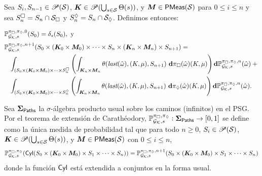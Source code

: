 Sea $S_i,S_{n-1}\in\mathscr{P}(\mathcal{S})$,
$\boldsymbol{K}\in\mathscr{P}(\bigcup_{s\in\mathcal{S}}\Theta(s))$, y
$\boldsymbol{M}\in\mathsf{PMeas}(\mathcal{S})$ para $0\leq i\leq n$ y sea $S_n^{\Box} =
	S_n\cap\mathcal{S}_{\Box}$ y $S_n^{\Diamond} = S_n\cap\mathcal{S}_{\Diamond}$. Definimos entonces:

\vspace{-1cm}
\begin{align*}
	\makebox[.8em]{}
	&\hspace{-.8em}\Prob^{\strat_{\maxplay},\strat_{\minplay},0}_{\StochGK,s}(S_0) =  \Dirac_{s}(S_0), \text{   y} \\[.5ex]
	&\hspace{-.8em}\Prob^{\strat_{\maxplay},\strat_{\minplay},n+1}_{\StochGK,s}(S_0\times(\polys_0\times \meass_0)\times \cdots\times S_n\times(\polys_n\times\meass_n)\times S_{n+1}) = {} \\
	&\int_{(S_0\times(\polys_0\times \meass_0)\times \cdots\times S_n^\maxplay}
	\left(
	\int_{\polys_n\times\meass_n}\sgtrans(\last(\hat{\omega}),(K,\mu), S_{n+1})\ \diff\strat_\maxplay(\hat{\omega})(K,\mu)
	\right)
	\diff\Prob^{\strat_{\maxplay},\strat_{\minplay},n}_{\StochGK,s}(\hat{\omega}) + {} \\
	&\int_{(S_0\times(\polys_0\times \meass_0)\times \cdots\times S_n^\minplay}
	\left(
	\int_{\polys_n\times\meass_n}\sgtrans(\last(\hat{\omega}),(K,\mu), S_{n+1})\ \diff\strat_\minplay(\hat{\omega})(K,\mu)
	\right)
	\diff\Prob^{\strat_{\maxplay},\strat_{\minplay},n}_{\StochGK,s}(\hat{\omega}).
\end{align*}

Sea $\bm{\Sigma}_{\textsf{Paths}}$ la $\sigma$-álgebra producto usual sobre los caminos
(infinitos) en el PSG. Por el teorema de extensión de Carathéodory,
$\mathbb{P}^{\pi_{{\Box}},\pi_{{\Diamond}}}_{{\mathcal{G}_{\mathcal{K}}},s}:\bm{\Sigma}_{\textsf{Paths}}\to[0,1]$
se define como la única medida de probabilidad tal que para todo $n\geq 0$,
$S_i\in\mathscr{P}(\mathcal{S})$,
$\boldsymbol{K}\in\mathscr{P}(\bigcup_{s\in\mathcal{S}}\Theta(s))$, y
$\boldsymbol{M}\in\mathsf{PMeas}(\mathcal{S})$ con $0\leq i\leq n$,%
%
\[\mathbb{P}^{\pi_{{\Box}},\pi_{{\Diamond}}}_{{\mathcal{G}_{\mathcal{K}}},s}(\textsf{Cyl}(S_0\times(\boldsymbol{K}_0\times \boldsymbol{M}_0)\times S_1\times \cdots\times S_n)) = \mathbb{P}^{\pi_{{\Box}},\pi_{{\Diamond}},n+1}_{{\mathcal{G}_{\mathcal{K}}},s}(S_0\times(\boldsymbol{K}_0\times \boldsymbol{M}_0)\times S_1\times \cdots\times S_n)\]
%
donde la funci\'on $\textsf{Cyl}$ est\'a extendida a conjuntos en la forma usual.


